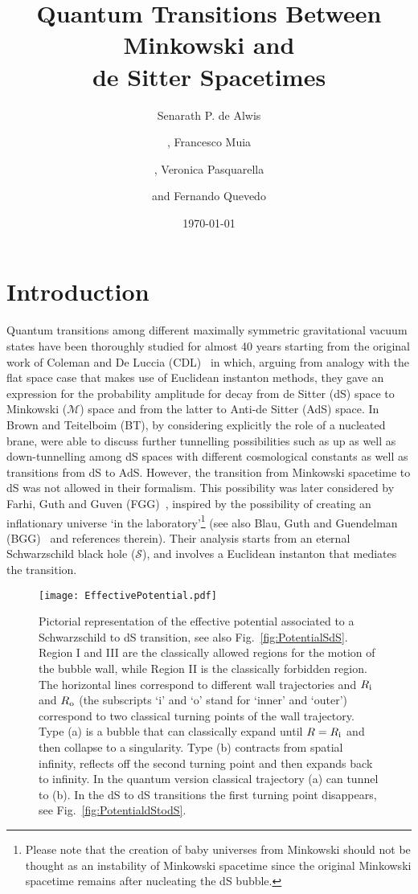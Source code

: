 \documentclass[11pt,a4paper]{article}
\title{Quantum Transitions Between Minkowski and\\ de Sitter Spacetimes}
\author[1]{\small Senarath P. de Alwis}
\author[2]{\small, Francesco Muia}
\author[2,3]{\small, Veronica Pasquarella}
\author[2,4]{\small and Fernando Quevedo}
\affiliation[1]{\small \it Physics Department, University of Colorado, Boulder, CO 80309 USA}
\affiliation[2]{\small \it ICTP, Strada Costiera 11, Trieste 34151, Italy}
\affiliation[3]{\small \it Dipartimento di Fisica, Universita'  di Trieste, Strada Costiera 11, 34151 Trieste, Italy}
\affiliation[4]{\small \it DAMTP, Centre for Mathematical Sciences, Wilberforce Road, Cambridge, CB3 0WA, UK}
\date{\small\today}
\begin{document}
 
\maketitle



\section{Introduction}
\label{sec:Introduction}
Quantum transitions among different maximally symmetric gravitational vacuum states have been thoroughly studied for almost 40 years starting from the original work of Coleman and De Luccia (CDL)~\cite{Coleman:1980aw} in which, arguing from analogy with the flat space case that makes use of Euclidean instanton methods, they gave an expression for the probability amplitude for decay from de Sitter (dS) space to Minkowski ($\mathcal{M}$) space and from the latter to Anti-de Sitter (AdS) space. In~\cite{Brown:1988kg} Brown and Teitelboim (BT),  by considering explicitly the role of a nucleated brane, were able to discuss further tunnelling possibilities such as up as well as down-tunnelling among dS spaces with different cosmological constants  as well as transitions from dS to AdS. However,
the transition from Minkowski spacetime to dS was not allowed in their formalism. This possibility was later considered by Farhi, Guth and Guven (FGG)~\cite{Farhi:1989yr}, inspired by the possibility of creating an inflationary universe `in the laboratory'\footnote{Please note that the creation of baby universes from Minkowski should not be thought as an instability of Minkowski spacetime since the original Minkowski spacetime remains after nucleating the dS bubble.} (see also Blau, Guth and Guendelman (BGG)~\cite{Blau:1986cw} and references therein). Their analysis starts from an eternal Schwarzschild black hole ($\mathcal S$), and involves a Euclidean instanton that mediates the transition. 
\begin{figure}[h!] 
\begin{center} 
\texttt{[image: EffectivePotential.pdf]} 
\caption{\footnotesize{Pictorial representation of the effective potential associated to a Schwarzschild to dS transition, see also Fig.~\ref{fig:PotentialSdS}. Region I and III are the classically allowed regions for the motion of the bubble wall, while Region II is the classically forbidden region. The horizontal lines correspond to different wall trajectories and $R_{\rm i}$ and $R_{\rm o}$ (the subscripts `i' and `o' stand for `inner' and `outer') correspond to two classical turning points of the wall trajectory. Type (a) is a bubble that can classically expand until $R = R_{\rm i}$ and then collapse to a singularity. Type (b) contracts from spatial infinity, reflects off the second turning  point and then expands back to infinity. In the quantum version classical trajectory (a) can tunnel to (b). In the dS to dS transitions the first turning point disappears, see Fig.~\ref{fig:PotentialdStodS}.\label{fig:EffectivePotential}}}
\end{center} 
\end{figure}
\end{document}

